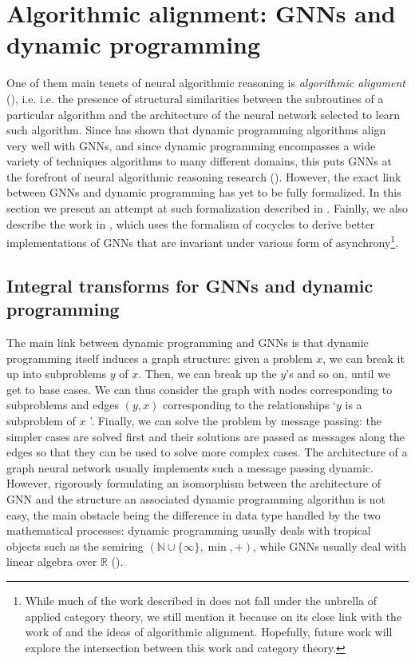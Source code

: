 \documentclass[11pt,a4paper,openright,twoside]{report}
\theoremstyle{plain}
\theoremstyle{definition}
\begin{document}
\section{Algorithmic alignment: GNNs and dynamic programming}


One of them main tenets of neural algorithmic reasoning is \textit{algorithmic alignment} (\cite{xu2019can}), i.e. i.e. the presence of structural similarities between the subroutines of a particular algorithm and the architecture of the neural network selected to learn such algorithm.
Since \cite{xu2019can} has shown that dynamic programming algorithms align very well with GNNs, and since dynamic programming encompasses a wide variety of techniques algorithms to many different domains, this puts GNNs at the forefront of neural algorithmic reasoning research (\cite{dudzik2022graph}). However, the exact link between GNNs and dynamic programming has yet to be fully formalized. In this section we present an attempt at such formalization described in \cite{dudzik2022graph}. Fainlly, we also describe the work in \cite{dudzik2024asynchronous}, which uses the formalism of cocycles to derive better implementations of GNNs that are invariant under various form of asynchrony\footnote{While much of the work described in \cite{dudzik2024asynchronous} does not fall under the unbrella of applied category theory, we still mention it because on its close link with the work of \cite{dudzik2022graph} and the ideas of algorithmic alignment. Hopefully, future work will explore the intersection between this work and category theory.}.


\subsection{Integral transforms for GNNs and dynamic programming}

The main link between dynamic programming and GNNs is that dynamic programming itself induces a graph structure: given a problem $x$, we can break it up into subproblems $y$ of $x$. Then, we can break up the $y$'s and so on, until we get to base cases. We can thus consider the graph with nodes corresponding to subproblems and edges $(y,x)$ corresponding to the relationships \lq $y$ is a subproblem of $x$ \rq. Finally, we can solve the problem by message passing: the simpler cases are solved first and their solutions are passed as messages along the edges so that they can be used to solve more complex cases. The architecture of a graph neural network usually implements such a message passing dynamic. However, rigorously formulating an isomorphism between the architecture of GNN and the structure an associated dynamic programming algorithm is not easy, the main obstacle being the difference in data type handled by the two mathematical processes: dynamic programming usually deals with tropical objects such as the semiring $(\mathbb{N} \cup \{\infty\}, \min, +)$, while GNNs usually deal with linear algebra over $\mathbb{R}$ (\cite{dudzik2022graph}).
\end{document}
